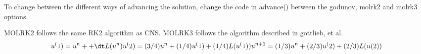 To change between the different ways of advancing the solution, change
the code in advance() between the godunov, molrk2 and molrk3 options.

MOLRK2 follows the same RK2 algorithm as CNS.
MOLRK3 follows the algorithm described in gottlieb, et al.
$$
u^(1) = u^n +  + \dt L(u^n)  \\
u^(2) = (3/4) u^n + (1/4) u^(1)  + (1/4) L(u^(1))
u^{n+1} = (1/3) u^n + (2/3) u^(2)  + (2/3) L(u(2))
$$
